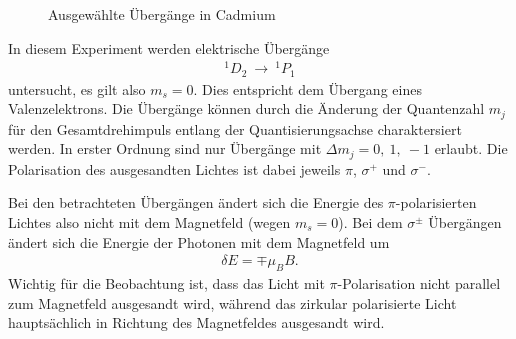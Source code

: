 \begin{figure}[h]
  \centering
  \caption{Ausgewählte Übergänge in Cadmium}
  \label{fig:level}
\end{figure}  

In diesem Experiment werden elektrische Übergänge 
\begin{align*}
^1D_2 \ \rightarrow  \ ^1P_1 
\end{align*}
untersucht, es gilt also $m_s=0$. Dies entspricht dem Übergang eines Valenzelektrons. Die Übergänge können durch die Änderung der Quantenzahl $m_j$ für den Gesamtdrehimpuls entlang der Quantisierungsachse charaktersiert werden. In erster Ordnung sind nur Übergänge mit $\Delta m_j=0, \ 1, \ -1$ erlaubt. Die Polarisation des ausgesandten Lichtes ist dabei jeweils $\pi$, $\sigma ^+$ und $\sigma^-$.

Bei den betrachteten Übergängen ändert sich die Energie des $\pi$-polarisierten Lichtes also nicht mit dem Magnetfeld (wegen $m_s=0$). Bei dem $\sigma^{\pm}$ Übergängen ändert sich die Energie der Photonen mit dem Magnetfeld um
\begin{align}
  \delta E=\mp \mu_B B.
  \label{eq:de}
\end{align}
Wichtig für die Beobachtung ist, dass das Licht mit $\pi$-Polarisation nicht parallel zum Magnetfeld ausgesandt wird, während das zirkular polarisierte Licht hauptsächlich in Richtung des Magnetfeldes ausgesandt wird.
